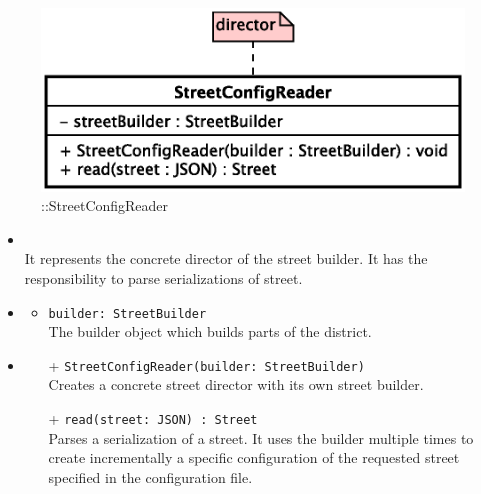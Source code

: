 \begin{figure}[h]
\centering
\includegraphics[scale=0.6,keepaspectratio]{images/solution/app/backend/street_config_reader.eps}
\caption{\pReactiveBuild::StreetConfigReader}
\label{fig:sd-app-street-config-reader}
\end{figure}
\FloatBarrier
\begin{itemize}
  \item \textbf{\descr} \\
    It represents the concrete director of the street builder.
    It has the responsibility to parse serializations of street.
  \item \textbf{\attrs}
  \begin{itemize}
    \item \texttt{builder: StreetBuilder} \\
The builder object which builds parts of the district.
  \end{itemize}
  \item \textbf{\ops}
  \begin{itemize} 
    \item[+] \texttt{StreetConfigReader(builder: StreetBuilder)} \\
Creates a concrete street director with its own street builder.
    \item[+] \texttt{read(street: JSON) : Street} \\
Parses a serialization of a street.
It uses the builder multiple times to create incrementally a 
specific configuration of the requested street specified 
in the configuration file. 
  \end{itemize}
\end{itemize}
